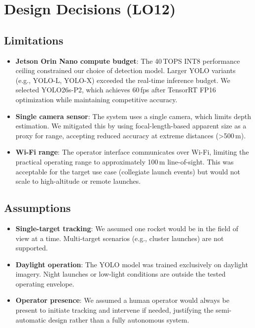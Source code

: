 \documentclass{article}
\begin{document}
\section{Design Decisions (LO12)}

\subsection*{Limitations}

\begin{itemize}
  \item \textbf{Jetson Orin Nano compute budget}: The 40\,TOPS INT8 performance
        ceiling constrained our choice of detection model. Larger YOLO variants
        (e.g., YOLO-L, YOLO-X) exceeded the real-time inference budget. We selected
        YOLO26s-P2, which achieves 60\,fps after TensorRT FP16 optimization while
        maintaining competitive accuracy.
  \item \textbf{Single camera sensor}: The system uses a single camera, which
        limits depth estimation. We mitigated this by using focal-length-based
        apparent size as a proxy for range, accepting reduced accuracy at extreme
        distances (\textgreater{}500\,m).
  \item \textbf{Wi-Fi range}: The operator interface communicates over Wi-Fi,
        limiting the practical operating range to approximately 100\,m line-of-sight.
        This was acceptable for the target use case (collegiate launch events) but
        would not scale to high-altitude or remote launches.
\end{itemize}

\subsection*{Assumptions}

\begin{itemize}
  \item \textbf{Single-target tracking}: We assumed one rocket would be in the
        field of view at a time. Multi-target scenarios (e.g., cluster launches)
        are not supported.
  \item \textbf{Daylight operation}: The YOLO model was trained exclusively on
        daylight imagery. Night launches or low-light conditions are outside the
        tested operating envelope.
  \item \textbf{Operator presence}: We assumed a human operator would always be
        present to initiate tracking and intervene if needed, justifying the
        semi-automatic design rather than a fully autonomous system.
\end{itemize}
\end{document}
